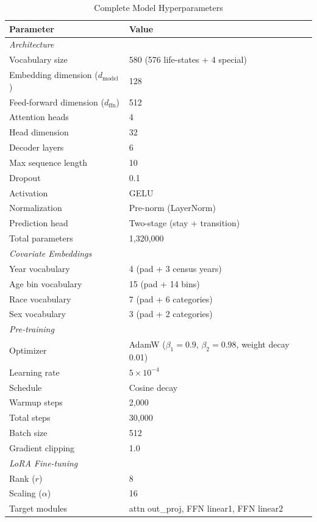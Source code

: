 \documentclass[12pt]{article}
\begin{document}
\begin{table}[H]
\centering
\caption{Complete Model Hyperparameters}
\label{tab:hyperparams}
\begin{tabular}{ll}
\toprule
Parameter & Value \\
\midrule
\multicolumn{2}{l}{\textit{Architecture}} \\
Vocabulary size & 580 (576 life-states + 4 special) \\
Embedding dimension ($d_{\text{model}}$) & 128 \\
Feed-forward dimension ($d_{\text{ffn}}$) & 512 \\
Attention heads & 4 \\
Head dimension & 32 \\
Decoder layers & 6 \\
Max sequence length & 10 \\
Dropout & 0.1 \\
Activation & GELU \\
Normalization & Pre-norm (LayerNorm) \\
Prediction head & Two-stage (stay + transition) \\
Total parameters & 1,320,000 \\
\midrule
\multicolumn{2}{l}{\textit{Covariate Embeddings}} \\
Year vocabulary & 4 (pad + 3 census years) \\
Age bin vocabulary & 15 (pad + 14 bins) \\
Race vocabulary & 7 (pad + 6 categories) \\
Sex vocabulary & 3 (pad + 2 categories) \\
\midrule
\multicolumn{2}{l}{\textit{Pre-training}} \\
Optimizer & AdamW ($\beta_1=0.9$, $\beta_2=0.98$, weight decay 0.01) \\
Learning rate & $5 \times 10^{-4}$ \\
Schedule & Cosine decay \\
Warmup steps & 2,000 \\
Total steps & 30,000 \\
Batch size & 512 \\
Gradient clipping & 1.0 \\
\midrule
\multicolumn{2}{l}{\textit{LoRA Fine-tuning}} \\
Rank ($r$) & 8 \\
Scaling ($\alpha$) & 16 \\
Target modules & attn out\_proj, FFN linear1, FFN linear2 \\

\end{tabular}
\end{table}
\end{document}
